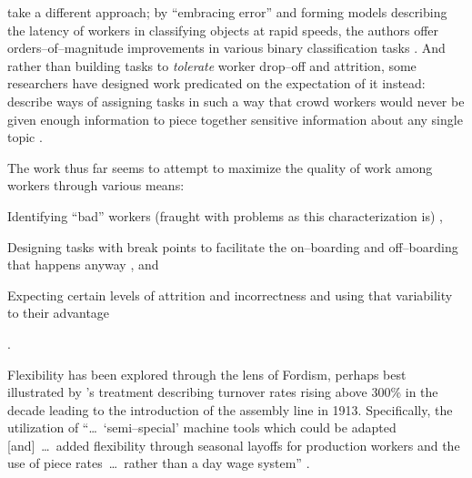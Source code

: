 \documentclass[trackingWork]{subfiles}
\begin{document}
\citeauthor{embracingErrorKrishna} take a different approach;
by ``embracing error'' and forming models describing the latency of workers in classifying objects at rapid speeds,
the authors offer orders--of--magnitude improvements
in various binary classification tasks
\cite{embracingErrorKrishna}.
And rather than building tasks to \textit{tolerate} worker drop--off and attrition,
some researchers have designed work predicated on the expectation of it instead:
\citeauthor{sensitiveTasks} describe ways of assigning tasks in such a way that
crowd workers would never be given enough information to piece together sensitive information about
any single topic
\cite{sensitiveTasks}.

The work thus far seems to attempt to maximize the quality of work among workers through various means:
\begin{inlinelist}
  \item Identifying ``bad'' workers (fraught with problems as this characterization is) \cite{MaliciousCrowdworkersGadiraju},
  \item Designing tasks with break points to facilitate the on--boarding and off--boarding that happens anyway \cite{cheng2015break}, and
  \item Expecting certain levels of attrition and incorrectness and using that variability to their advantage \cite{embracingErrorKrishna}
\end{inlinelist}.




Flexibility has been explored through the lens of Fordism, perhaps best illustrated by
\citeauthor{tolliday1986between}'s treatment describing
turnover rates rising above 300\% in the decade leading to the introduction of the assembly line in 1913.
Specifically, the utilization of ``\dots~`semi--special' machine tools which could be adapted
[and]~\dots~added flexibility through seasonal layoffs for production workers and the use of
piece rates~\dots~rather than a day wage system''
\cite{tolliday1986between}.
\end{document}
